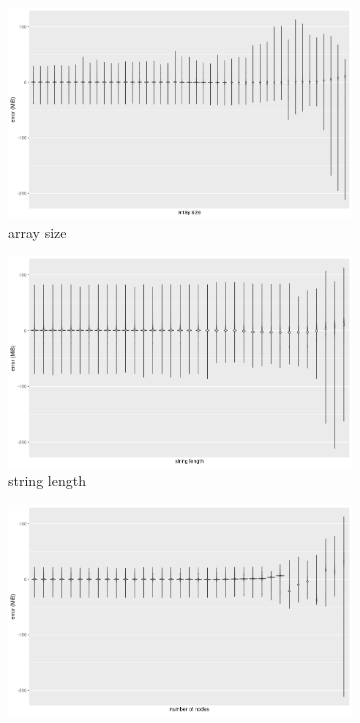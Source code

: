\documentclass{article}
\begin{document}
\begin{figure}
  \centering
  \begin{subfigure}[t]{0.49\textwidth}
    \centering
    \includegraphics[width=\textwidth]{../io_memory_tests/plots/prediction_violin_array_size.png}
    \caption{array size}
  \end{subfigure}
  \begin{subfigure}[t]{0.49\textwidth}
    \centering
    \includegraphics[width=\textwidth]{../io_memory_tests/plots/prediction_violin_string_length.png}
    \caption{string length}
    \label{fig:prediction_violin_b}
  \end{subfigure}
  \begin{subfigure}[t]{0.49\textwidth}
    \centering
    \includegraphics[width=\textwidth]{../io_memory_tests/plots/prediction_violin_num_nodes.png}

\end{subfigure}
\end{figure}
\end{document}
